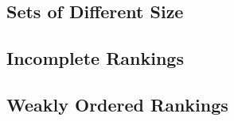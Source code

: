 \subsection{Sets of Different Size}
\subsection{Incomplete Rankings}
\subsection{Weakly Ordered Rankings}
